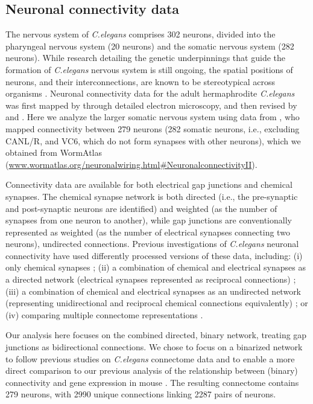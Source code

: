 \subsection*{Neuronal connectivity data}
The nervous system of \emph{C.elegans} comprises 302 neurons, divided into the pharyngeal nervous system (20 neurons) and the somatic nervous system (282 neurons).
While research detailing the genetic underpinnings that guide the formation of \textit{C.elegans} nervous system is still ongoing, the spatial positions of neurons, and their interconnections, are known to be stereotypical across organisms \citep{Riddle1997}.
Neuronal connectivity data for the adult hermaphrodite \emph{C.elegans} was first mapped by \citet{White1986} through detailed electron microscopy, and then revised by \citet{Chen2006} and \citet{Varshney2011}.
Here we analyze the larger somatic nervous system using data from \citet{Varshney2011}, who mapped connectivity between 279 neurons (282 somatic neurons, i.e., excluding CANL/R, and VC6, which do not form synapses with other neurons), which we obtained from WormAtlas \citep{WormAtlas} (\url{www.wormatlas.org/neuronalwiring.html#NeuronalconnectivityII}).

Connectivity data are available for both electrical gap junctions and chemical synapses.
The chemical synapse network is both directed (i.e., the pre-synaptic and post-synaptic neurons are identified) and weighted (as the number of synapses from one neuron to another), while gap junctions are conventionally represented as weighted (as the number of electrical synapses connecting two neurons), undirected connections.
Previous investigations of \emph{C.elegans} neuronal connectivity have used differently processed versions of these data, including:
(i) only chemical synapses \citep{Kashtan2004};
(ii) a combination of chemical and electrical synapses as a directed network (electrical synapses represented as reciprocal connections) \citep{Azulay2016, Kim2016};
(iii) a combination of chemical and electrical synapses as an undirected network (representing unidirectional and reciprocal chemical connections equivalently) \citep{Towlson2013, Kim2014a, Pavlovic2014, Demesmaeker2017};
or (iv) comparing multiple connectome representations \citep{Pan2010}.

Our analysis here focuses on the combined directed, binary network, treating gap junctions as bidirectional connections.
We chose to focus on a binarized network to follow previous studies on \textit{C.elegans} connectome data \citep{Kaufman2006, Towlson2013, Varier2011, Varadan2006, Pavlovic2014} and to enable a more direct comparison to our previous analysis of the relationship between (binary) connectivity and gene expression in mouse \citep{Fulcher2016}.
The resulting connectome contains 279 neurons, with \num{2990} unique connections linking \num{2287} pairs of neurons.

